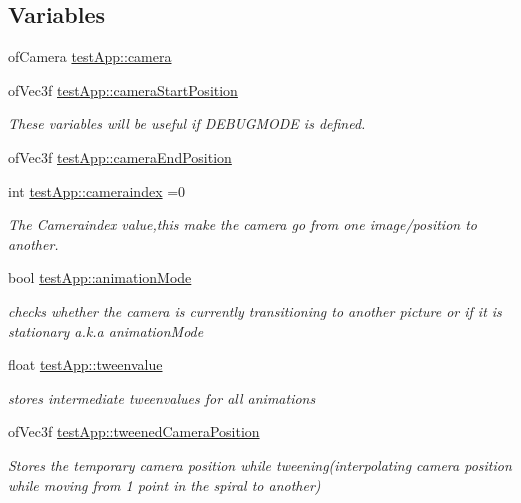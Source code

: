 \subsection*{Variables}
\begin{DoxyCompactItemize}
\item 
of\-Camera \hyperlink{group___camera_ga0278ee237cbbd881252d6273b131bb55}{test\-App\-::camera}
\item 
of\-Vec3f \hyperlink{group___camera_gac01013264b9988207e7fd9e0a486ff2f}{test\-App\-::camera\-Start\-Position}
\begin{DoxyCompactList}\small\item\em These variables will be useful if D\-E\-B\-U\-G\-M\-O\-D\-E is defined. \end{DoxyCompactList}\item 
of\-Vec3f \hyperlink{group___camera_gad3319d9cd3cb00e898f4f602b879efad}{test\-App\-::camera\-End\-Position}
\item 
int \hyperlink{group___camera_ga4ca3a51642dedbf37f2b9f6ef96510c7}{test\-App\-::cameraindex} =0
\begin{DoxyCompactList}\small\item\em The Cameraindex value,this make the camera go from one image/position to another. \end{DoxyCompactList}\item 
bool \hyperlink{group___camera_ga2a5d49fd1f7f50f745f56095a1fa0099}{test\-App\-::animation\-Mode}
\begin{DoxyCompactList}\small\item\em checks whether the camera is currently transitioning to another picture or if it is stationary a.\-k.\-a animation\-Mode \end{DoxyCompactList}\item 
float \hyperlink{group___camera_gadd9ab1aa902948afbdf1c6db0dfde385}{test\-App\-::tweenvalue}
\begin{DoxyCompactList}\small\item\em stores intermediate tweenvalues for all animations \end{DoxyCompactList}\item 
of\-Vec3f \hyperlink{group___camera_gae9f60797c1c5d9f1ac06e1d6a5259957}{test\-App\-::tweened\-Camera\-Position}
\begin{DoxyCompactList}\small\item\em Stores the temporary camera position while tweening(interpolating camera position while moving from 1 point in the spiral to another) \end{DoxyCompactList}\item 

\end{DoxyCompactItemize}
